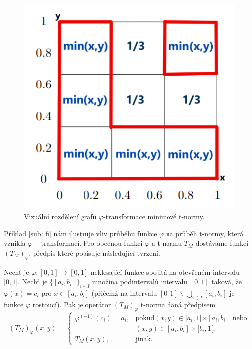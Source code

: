 \begin{figure}[H]
\caption{ Vizu\' aln\' i rozd\v elen\'i grafu $\varphi$-transformace minimov\' e t-normy.\\}
                \hspace{-1cm}
                \includegraphics[scale=0.60]{template-fig/phi-tnorm.pdf}
                \centering
            \end{figure}


    
Příklad \ref{sub: fi} nám ilustruje vliv průběhu funkce $\varphi$ na průběh t-normy, která vznikla $\varphi-$transformací. Pro obecnou funkci $\varphi$ a t-normu $T_M$ dostáváme funkci $(T_M)_{\varphi}$, předpis které popisuje následující tvrzení.
\begin{sentence}
\cite{mitav}
\label{t-norm}
 Nech\v t je $\varphi:[0,1]\rightarrow [0,1]$
neklesající funkce spojitá na otevřeném intervalu $]0,1[$.
Nech\v t je $\{[a_i,b_i]\}_{i\in I}$ množina podinterval\r u
intervalu $[0,1]$ taková, že $\varphi(x)=c_i$ pro $x\in
[a_i,b_i]$ (přičemž na intervalu $[0,1]\backslash \bigcup \limits_{i \in I}
[a_i,b_i]$ je funkce $\varphi$
rostoucí).
Pak je operátor $(T_M)_{\varphi}$  t-norma daná předpisem
$$ (T_M)_{\varphi}(x,y) = \begin{cases} \varphi^{(-1)}(c_i)=a_i, &\mbox {pokud
$(x,y)\in [a_i,1[\times[a_i,b_i]$ nebo}
\\ & (x,y)\in [a_i,b_i]\times[b_i,1[,
\\ T_M(x,y), &\mbox {jinak.}
\end{cases} $$
\end{sentence}

